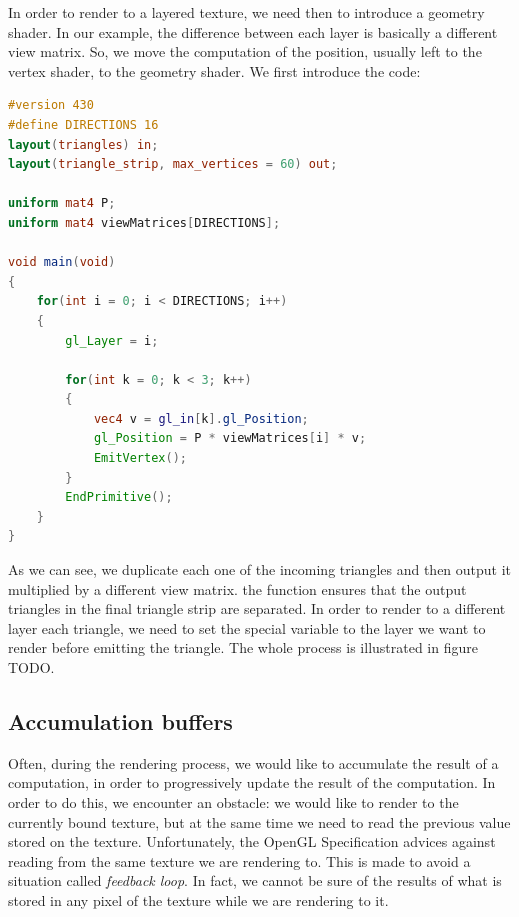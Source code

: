 In order to render to a layered texture, we need then to introduce a geometry shader. In our example, the difference between each layer is basically a different view matrix. So, we move the computation of the position, usually left to the vertex shader, to the geometry shader. We first introduce the code:

\begin{lstlisting}[language=GLSL,label=lst:arraygeomshader,caption={Geometry shader for layered rendering. The multiplication by the model matrix of vertex v is performed in the vertex shader (not shown).}]
#version 430
#define DIRECTIONS 16
layout(triangles) in;
layout(triangle_strip, max_vertices = 60) out;

uniform mat4 P;
uniform mat4 viewMatrices[DIRECTIONS];

void main(void)
{
    for(int i = 0; i < DIRECTIONS; i++)
    {
        gl_Layer = i;

        for(int k = 0; k < 3; k++)
        {
            vec4 v = gl_in[k].gl_Position;
            gl_Position = P * viewMatrices[i] * v;
            EmitVertex();
        }
        EndPrimitive();
    }
}
\end{lstlisting}

As we can see, we duplicate each one of the incoming triangles and then output it multiplied by a different view matrix. the  function ensures that the output triangles in the final triangle strip are separated. In order to render to a different layer each triangle, we need to set the special  variable to the layer we want to render before emitting the triangle. The whole process is illustrated in figure TODO.

\subsection{Accumulation buffers}

Often, during the rendering process, we would like to accumulate the result of a computation, in order to progressively update the result of the computation. In order to do this, we encounter an obstacle: we would like to render to the currently bound texture, but at the same time we need to read the previous value stored on the texture. Unfortunately, the OpenGL Specification \citep{openglspec} advices against reading from the same texture we are rendering to. This is made to avoid a situation called \emph{feedback loop}. In fact, we cannot be sure of the results of what is stored in any pixel of the texture while we are rendering to it. 

